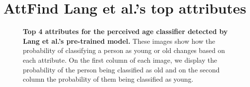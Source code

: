 \section{AttFind Lang et al.'s top attributes}
\label{app:B}
\begin{figure}[H]
\centering
    \hspace{0.2em}
    \hspace{0.2em}
    \hspace{0.2em}
    
    
    \caption {\textbf{Top 4 attributes for the perceived age classifier detected by Lang et al.'s pre-trained model.} These images show how the probability of classifying a person as young or old changes based on each attribute. On the first column of each image, we display the probability of the person being classified as old and on the second column the probability of them being classified as young.} 
    \label{fig:top 4 attrs theirs}
\end{figure}

